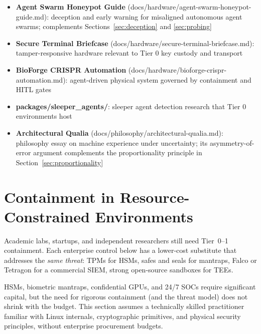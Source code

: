 \documentclass[11pt,letterpaper]{article}
\begin{document}
\begin{itemize}
  \item \textbf{Agent Swarm Honeypot Guide} (docs/hardware/agent-swarm-honeypot-guide.md): deception and early warning for misaligned autonomous agent swarms; complements Sections~\ref{sec:deception} and \ref{sec:probing}
  \item \textbf{Secure Terminal Briefcase} (docs/hardware/secure-terminal-briefcase.md): tamper-responsive hardware relevant to Tier 0 key custody and transport
  \item \textbf{BioForge CRISPR Automation} (docs/hardware/bioforge-crispr-automation.md): agent-driven physical system governed by containment and HITL gates
  \item \textbf{packages/sleeper\_agents/}: sleeper agent detection research that Tier 0 environments host
  \item \textbf{Architectural Qualia} (docs/philosophy/architectural-qualia.md): philosophy essay on machine experience under uncertainty; its asymmetry-of-error argument complements the proportionality principle in Section~\ref{sec:proportionality}
\end{itemize}


\section{Containment in Resource-Constrained Environments}
\label{sec:resource-constrained}

\begin{glance}
Academic labs, startups, and independent researchers still need Tier~0--1 containment. Each enterprise control below has a lower-cost substitute that addresses the \emph{same threat}: TPMs for HSMs, safes and seals for mantraps, Falco or Tetragon for a commercial SIEM, strong open-source sandboxes for TEEs.
\end{glance}

HSMs, biometric mantraps, confidential GPUs, and 24/7 SOCs require significant capital, but the need for rigorous containment (and the threat model) does not shrink with the budget. This section assumes a technically skilled practitioner familiar with Linux internals, cryptographic primitives, and physical security principles, without enterprise procurement budgets.
\end{document}
